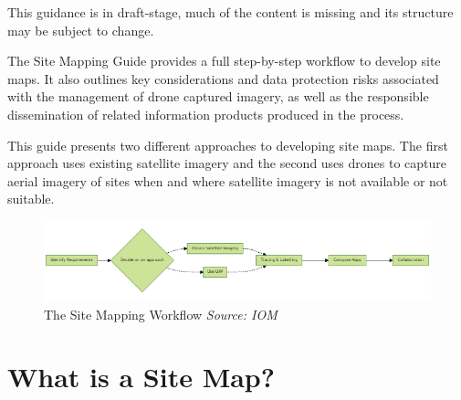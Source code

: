 \documentclass[
  a4paper,
  onecolumn,
  oneside]{book}
\begin{document}
\begin{tcolorbox}[enhanced jigsaw, opacitybacktitle=0.6, colbacktitle=quarto-callout-warning-color!10!white, breakable, coltitle=black, title=\textcolor{quarto-callout-warning-color}{\faExclamationTriangle}\hspace{0.5em}{Warning}, toprule=.15mm, bottomrule=.15mm, colback=white, left=2mm, toptitle=1mm, bottomtitle=1mm, arc=.35mm, colframe=quarto-callout-warning-color-frame, titlerule=0mm, opacityback=0, rightrule=.15mm, leftrule=.75mm]

This guidance is in draft-stage, much of the content is missing and its
structure may be subject to change.

\end{tcolorbox}

The Site Mapping Guide provides a full step-by-step workflow to develop
site maps. It also outlines key considerations and data protection risks
associated with the management of drone captured imagery, as well as the
responsible dissemination of related information products produced in
the process.

This guide presents two different approaches to developing site maps.
The first approach uses existing satellite imagery and the second uses
drones to capture aerial imagery of sites when and where satellite
imagery is not available or not suitable.

\begin{figure}

{\centering \includegraphics[width=1\textwidth,height=\textheight]{./images/workflow.png}

}

\caption{\label{fig-workflow}The Site Mapping Workflow \emph{Source:
IOM}}

\end{figure}

\hypertarget{what-is-a-site-map}{%
\section*{What is a Site Map?}\label{what-is-a-site-map}}

\end{document}
